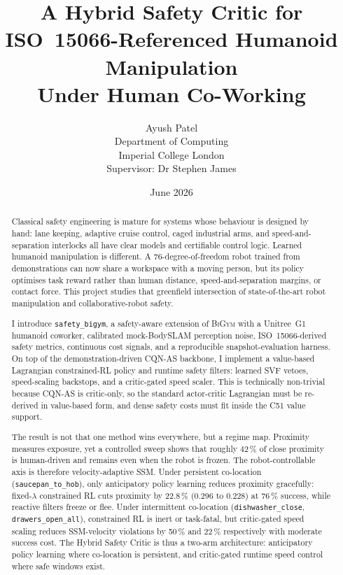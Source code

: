 \documentclass[11pt,a4paper]{report}
\title{A Hybrid Safety Critic for\\
       ISO~15066-Referenced Humanoid Manipulation\\
       Under Human Co-Working}
\author{Ayush Patel \\
        Department of Computing \\
        Imperial College London \\[1ex]
        Supervisor: Dr Stephen James}
\date{June 2026}
\newcommand{\ssm}{SSM}
\newcommand{\iso}{ISO~15066}
\newcommand{\bigym}{\textsc{BiGym}}
\newcommand{\sbigym}{\texttt{safety\_bigym}}
\newcommand{\cqnas}{CQN-AS}
\newcommand{\bodyslampp}{BodySLAM\nolinebreak[4]\hspace{-.05em}\raisebox{.2ex}{\scriptsize ++}}
\begin{document}

\maketitle

\begin{abstract}
\noindent
Classical safety engineering is mature for systems whose behaviour is
designed by hand: lane keeping, adaptive cruise control, caged
industrial arms, and speed-and-separation interlocks all have clear
models and certifiable control logic. Learned humanoid manipulation is
different. A 76-degree-of-freedom robot trained from demonstrations can
now share a workspace with a moving person, but its policy optimises
task reward rather than human distance, speed-and-separation margins,
or contact force. This project studies that greenfield intersection of
state-of-the-art robot manipulation and collaborative-robot safety.

I introduce \sbigym{}, a safety-aware extension of \bigym{} with a
Unitree~G1 humanoid coworker, calibrated mock-\bodyslampp{} perception
noise, \iso{}-derived safety metrics, continuous cost signals, and a
reproducible snapshot-evaluation harness. On top of the
demonstration-driven \cqnas{} backbone, I implement a value-based
Lagrangian constrained-RL policy and runtime safety filters: learned
SVF vetoes, speed-scaling backstops, and a critic-gated speed scaler.
This is technically non-trivial because \cqnas{} is critic-only, so the
standard actor-critic Lagrangian must be re-derived in value-based
form, and dense safety costs must fit inside the C51 value support.

The result is not that one method wins everywhere, but a regime map.
Proximity measures exposure, yet a controlled sweep shows that roughly
42\,\% of close proximity is human-driven and remains even when the
robot is frozen. The robot-controllable axis is therefore
velocity-adaptive \ssm{}. Under persistent co-location
(\texttt{saucepan\_to\_hob}), only anticipatory policy learning reduces
proximity gracefully: fixed-$\lambda$ constrained RL cuts proximity by
22.8\,\% (0.296 to 0.228) at 76\,\% success, while reactive filters
freeze or flee. Under intermittent co-location
(\texttt{dishwasher\_close}, \texttt{drawers\_open\_all}), constrained
RL is inert or task-fatal, but critic-gated speed scaling reduces
\ssm{}-velocity violations by 50\,\% and 22\,\% respectively with
moderate success cost. The Hybrid Safety Critic is thus a two-arm
architecture: anticipatory policy learning where co-location is
persistent, and critic-gated runtime speed control where safe windows
exist.
\end{abstract}
\end{document}
